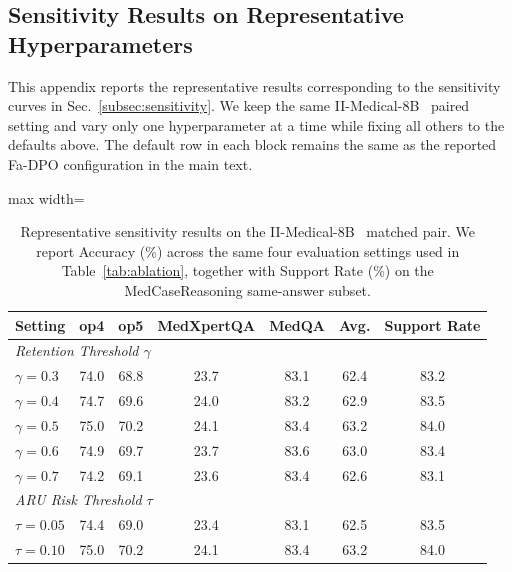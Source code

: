 \documentclass[a4paper,fleqn,doubleblind]{cas-sc}
\begin{document}
\subsection{Sensitivity Results on Representative Hyperparameters}
\label{app:sensitivity}

This appendix reports the representative results corresponding to the sensitivity curves in Sec.~\ref{subsec:sensitivity}. We keep the same II-Medical-8B~\cite{intelligentinternet2025iimedical8b} paired setting and vary only one hyperparameter at a time while fixing all others to the defaults above. The default row in each block remains the same as the reported Fa-DPO configuration in the main text.

\begin{table}[htbp]
    \centering
    \footnotesize
    \setlength{\tabcolsep}{4.2pt}
    \caption[Representative sensitivity results on the matched pair.]{Representative sensitivity results on the II-Medical-8B~\cite{intelligentinternet2025iimedical8b} matched pair. We report Accuracy (\%) across the same four evaluation settings used in Table~\ref{tab:ablation}, together with Support Rate (\%) on the MedCaseReasoning same-answer subset.}
    \label{tab:sensitivity}
    \begin{adjustbox}{max width=\textwidth}
    \begin{tabular}{lcccccc}
        \toprule
        \textbf{Setting} & \textbf{op4} & \textbf{op5} & \textbf{MedXpertQA} & \textbf{MedQA} & \textbf{Avg.} & \textbf{Support Rate} \\
        \midrule
        \multicolumn{7}{l}{\textit{Retention Threshold $\gamma$}} \\
        \quad $\gamma=0.3$ & 74.0 & 68.8 & 23.7 & 83.1 & 62.4 & 83.2 \\
        \quad $\gamma=0.4$ & 74.7 & 69.6 & 24.0 & 83.2 & 62.9 & 83.5 \\
        \quad $\gamma=0.5$ & 75.0 & 70.2 & 24.1 & 83.4 & 63.2 & 84.0 \\
        \quad $\gamma=0.6$ & 74.9 & 69.7 & 23.7 & 83.6 & 63.0 & 83.4 \\
        \quad $\gamma=0.7$ & 74.2 & 69.1 & 23.6 & 83.4 & 62.6 & 83.1 \\
        \midrule
        \multicolumn{7}{l}{\textit{ARU Risk Threshold $\tau$}} \\
        \quad $\tau=0.05$ & 74.4 & 69.0 & 23.4 & 83.1 & 62.5 & 83.5 \\
        \quad $\tau=0.10$ & 75.0 & 70.2 & 24.1 & 83.4 & 63.2 & 84.0 \\

\end{tabular}
\end{adjustbox}
\end{table}
\end{document}
